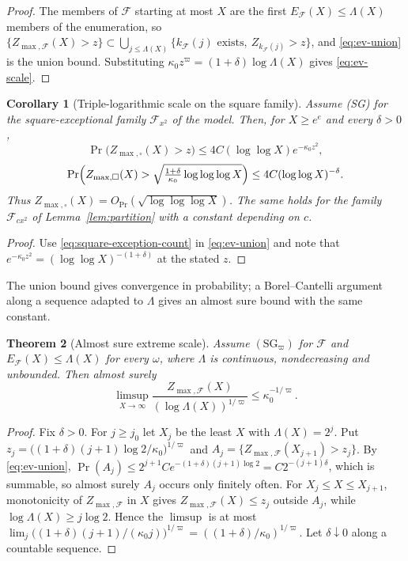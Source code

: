 \documentclass[11pt]{amsart}
\numberwithin{equation}{section}
\theoremstyle{plain}
\newtheorem{theorem}{Theorem}[section]
\newtheorem{corollary}[theorem]{Corollary}
\theoremstyle{definition}
\theoremstyle{remark}
\newcommand{\F}{\mathcal{F}}
\begin{document}
\begin{proof}
The members of $\F$ starting at most $X$ are the first $E_\F(X)\le \Lambda(X)$
members of the enumeration, so
$\{Z_{\max,\F}(X)>z\}\subset\bigcup_{j\le \Lambda(X)}\{k_\F(j)\text{ exists},\
Z_{k_\F(j)}>z\}$, and \eqref{eq:ev-union} is the union bound. Substituting
$\kappa_0z^\varpi=(1+\delta)\log \Lambda(X)$ gives \eqref{eq:ev-scale}.
\end{proof}

\begin{corollary}[Triple-logarithmic scale on the square family]
\label{cor:ev-square}
Assume (SG) for the square-exceptional family $\F_{x^2}$ of the model. Then,
for $X\ge e^e$ and every $\delta>0$,
\begin{equation}
\label{eq:ev-square}
\Pr\bigl(Z_{\max,\square}(X)>z\bigr)\le4C(\log\log X)e^{-\kappa_0z^2},
\end{equation}
\begin{equation}
\label{eq:ev-square-b}
\Pr\Bigl(Z_{\max,\square}(X)>\sqrt{\tfrac{1+\delta}{\kappa_0}\log\log\log X}\Bigr)
\le4C(\log\log X)^{-\delta}.
\end{equation}
Thus $Z_{\max,\square}(X)=O_{\Pr}(\sqrt{\log\log\log X})$. The same holds for
the family $\F_{cx^2}$ of Lemma~\ref{lem:partition} with a constant depending
on $c$.
\end{corollary}

\begin{proof}
Use \eqref{eq:square-exception-count} in \eqref{eq:ev-union} and note that
$e^{-\kappa_0z^2}=(\log\log X)^{-(1+\delta)}$ at the stated $z$.
\end{proof}

The union bound gives convergence in probability; a Borel--Cantelli argument
along a sequence adapted to $\Lambda$ gives an almost sure bound with the same
constant.

\begin{theorem}[Almost sure extreme scale]
\label{thm:ev-as}
Assume $(\mathrm{SG}_\varpi)$ for $\F$ and $E_\F(X)\le \Lambda(X)$ for every $\omega$,
where $\Lambda$ is continuous, nondecreasing and unbounded. Then almost surely
\[
\limsup_{X\to\infty}\frac{Z_{\max,\F}(X)}{(\log \Lambda(X))^{1/\varpi}}\le \kappa_0^{-1/\varpi}.
\]
\end{theorem}

\begin{proof}
Fix $\delta>0$. For $j\ge j_0$ let $X_j$ be the least $X$ with $\Lambda(X)=2^j$.
Put $z_j=\bigl((1+\delta)(j+1)\log2/\kappa_0\bigr)^{1/\varpi}$ and
$A_j=\{Z_{\max,\F}(X_{j+1})>z_j\}$. By \eqref{eq:ev-union},
$\Pr(A_j)\le2^{j+1}Ce^{-(1+\delta)(j+1)\log2}=C2^{-(j+1)\delta}$, which is
summable, so almost surely $A_j$ occurs only finitely often. For
$X_j\le X\le X_{j+1}$, monotonicity of $Z_{\max,\F}$ in $X$ gives
$Z_{\max,\F}(X)\le z_j$ outside $A_j$, while $\log \Lambda(X)\ge j\log2$. Hence
the $\limsup$ is at most
$\lim_j\bigl((1+\delta)(j+1)/(\kappa_0j)\bigr)^{1/\varpi}=((1+\delta)/\kappa_0)^{1/\varpi}$. Let
$\delta\downarrow0$ along a countable sequence.
\end{proof}
\end{document}
